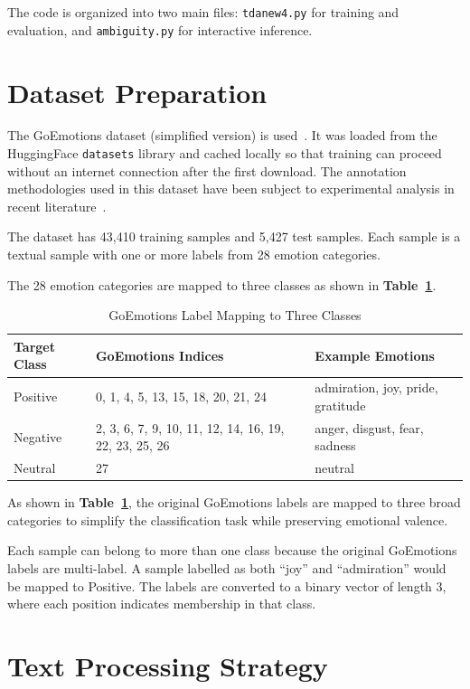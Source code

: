 The code is organized into two main files: \texttt{tdanew4.py} for training and evaluation, and
\texttt{ambiguity.\allowbreak py} for interactive inference.

\section{Dataset Preparation}

The GoEmotions dataset (simplified version) is used~\cite{goemotions}. It was loaded from the HuggingFace
\texttt{datasets} library and cached locally so that training can proceed without an internet
connection after the first download. The annotation methodologies used in this dataset have
been subject to experimental analysis in recent literature~\cite{emotion_annotation}.

The dataset has 43,410 training samples and 5,427 test samples. Each sample is a textual
sample with one or more labels from 28 emotion categories.

The 28 emotion categories are mapped to three classes as shown in \textbf{Table~\ref{tab:label_map}}.

\begin{table}[H]
\centering
\caption{GoEmotions Label Mapping to Three Classes}
\label{tab:label_map}
\begin{tabular}{llp{5cm}}
\toprule
\textbf{Target Class} & \textbf{GoEmotions Indices} & \textbf{Example Emotions} \\
\midrule
Positive & 0, 1, 4, 5, 13, 15, 18, 20, 21, 24 & admiration, joy, pride, gratitude \\
Negative & 2, 3, 6, 7, 9, 10, 11, 12, 14, 16, 19, 22, 23, 25, 26 & anger, disgust, fear, sadness \\
Neutral  & 27 & neutral \\
\bottomrule
\end{tabular}
\end{table}

As shown in \textbf{Table~\ref{tab:label_map}}, the original GoEmotions labels are mapped to three
broad categories to simplify the classification task while preserving emotional valence.

Each sample can belong to more than one class because the original GoEmotions labels are
multi-label. A sample labelled as both ``joy'' and ``admiration'' would be mapped to Positive.
The labels are converted to a binary vector of length 3, where each position indicates membership
in that class.

\section{Text Processing Strategy}

